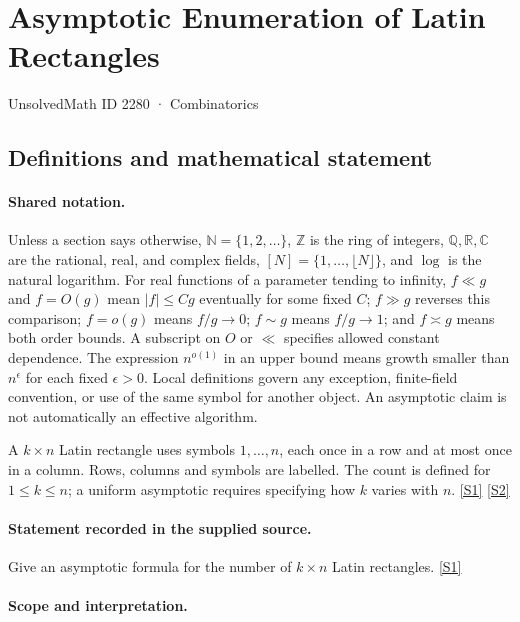 \documentclass[11pt,a4paper]{article}
\newcommand{\N}{\mathbb{N}}
\newcommand{\Z}{\mathbb{Z}}
\newcommand{\Q}{\mathbb{Q}}
\newcommand{\R}{\mathbb{R}}
\newcommand{\C}{\mathbb{C}}
\newcommand{\sref}[2]{\hyperlink{source:#1:#2}{[S#2]}}
\begin{document}

\setcounter{section}{2279}

\section{Asymptotic Enumeration of Latin Rectangles}\label{2280}

{\small\sffamily UnsolvedMath ID 2280 · Combinatorics}

\subsection{Definitions and mathematical statement}

\paragraph{Shared notation.}Unless a section says otherwise, $\N=\{1,2,\ldots\}$,
$\Z$ is the ring of integers, $\Q,\R,\C$ are the rational, real, and complex
fields, $[N]=\{1,\ldots,\lfloor N\rfloor\}$, and $\log$ is the natural
logarithm. For real functions of a parameter tending to infinity,
$f\ll g$ and $f=O(g)$ mean $|f|\leq Cg$ eventually for some fixed $C$;
$f\gg g$ reverses this comparison; $f=o(g)$ means $f/g\to0$;
$f\sim g$ means $f/g\to1$; and $f\asymp g$ means both order bounds.
A subscript on $O$ or $\ll$ specifies allowed constant dependence.
The expression $n^{o(1)}$ in an upper bound means growth smaller than
$n^\epsilon$ for each fixed $\epsilon>0$. Local definitions govern any
exception, finite-field convention, or use of the same symbol for another
object. An asymptotic claim is not automatically an effective algorithm.



A $k\times n$ Latin rectangle uses symbols $1,\ldots,n$, each once in a row and at most once in a column. Rows, columns and symbols are labelled. The count is defined for $1\leq k\leq n$; a uniform asymptotic requires specifying how $k$ varies with $n$. \sref{2280}{1} \sref{2280}{2}

\paragraph{Statement recorded in the supplied source.}
Give an asymptotic formula for the number of $k\times n$ Latin rectangles. \sref{2280}{1}

\paragraph{Scope and interpretation.}
\end{document}
